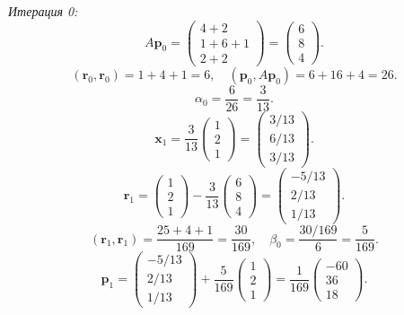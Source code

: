 \documentclass{article}
\begin{document}
\textit{Итерация 0:}
$$A\textbf{p}_0 = \begin{pmatrix} 4+2 \\ 1+6+1 \\ 2+2 \end{pmatrix} = \begin{pmatrix} 6 \\ 8 \\ 4 \end{pmatrix}.$$
$$(\textbf{r}_0, \textbf{r}_0) = 1 + 4 + 1 = 6, \quad (\textbf{p}_0, A\textbf{p}_0) = 6 + 16 + 4 = 26.$$
$$\alpha_0 = \frac{6}{26} = \frac{3}{13}.$$
$$\textbf{x}_1 = \frac{3}{13}\begin{pmatrix} 1 \\ 2 \\ 1 \end{pmatrix} = \begin{pmatrix} 3/13 \\ 6/13 \\ 3/13 \end{pmatrix}.$$
$$\textbf{r}_1 = \begin{pmatrix} 1 \\ 2 \\ 1 \end{pmatrix} - \frac{3}{13}\begin{pmatrix} 6 \\ 8 \\ 4 \end{pmatrix} = \begin{pmatrix} -5/13 \\ 2/13 \\ 1/13 \end{pmatrix}.$$
$$(\textbf{r}_1, \textbf{r}_1) = \frac{25+4+1}{169} = \frac{30}{169}, \quad \beta_0 = \frac{30/169}{6} = \frac{5}{169}.$$
$$\textbf{p}_1 = \begin{pmatrix} -5/13 \\ 2/13 \\ 1/13 \end{pmatrix} + \frac{5}{169}\begin{pmatrix} 1 \\ 2 \\ 1 \end{pmatrix} = \frac{1}{169}\begin{pmatrix} -60 \\ 36 \\ 18 \end{pmatrix}.$$
\end{document}
